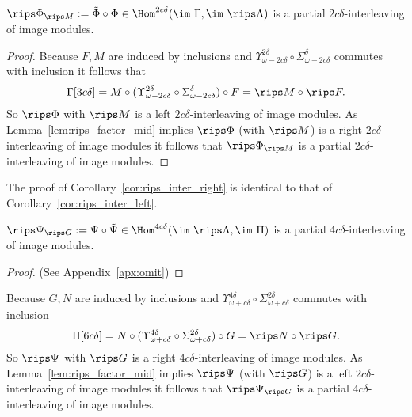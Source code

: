 \begin{corollary}\label{cor:rips_inter_left}
  $\rips \Phi_{\rips M} := \tilde{\Phi}\circ \Phi\in\Hom^{2c\delta}(\im~\Gamma,\im~\rips\Lambda)$ is a partial $2c\delta$-interleaving of image modules.
\end{corollary}
\begin{proof}
  Because $F,M$ are induced by inclusions and $\Upsilon_{\omega-2c\delta}^{2\delta}\circ \Sigma_{\omega-2c\delta}^{\delta}$ commutes with inclusion it follows that
  \[\Gamma[3c\delta] = M\circ (\Upsilon_{\omega-2c\delta}^{2\delta}\circ \Sigma_{\omega-2c\delta}^{\delta})\circ F = \rips M\circ \rips F.\]
  So $\rips\Phi$ with $\rips M$ is a left $2c\delta$-interleaving of image modules.
  As Lemma~\ref{lem:rips_factor_mid} implies $\rips \Phi$ (with $\rips M$) is a right $2c\delta$-interleaving of image modules it follows that $\rips \Phi_{\rips M}$ is a partial $2c\delta$-interleaving of image modules.
\end{proof}

The proof of Corollary~\ref{cor:rips_inter_right} is identical to that of Corollary~\ref{cor:rips_inter_left}.

\begin{corollary}\label{cor:rips_inter_right}
  $\rips \Psi_{\rips G} := \Psi\circ\tilde{\Psi}\in\Hom^{4c\delta}(\im~\rips\Lambda, \im~\Pi)$ is a partial $4c\delta$-interleaving of image modules.
\end{corollary}\begin{proof}
  (See Appendix~\ref{apx:omit})
\end{proof}
\proofatend
  Because $G,N$ are induced by inclusions and $\Upsilon_{\omega+c\delta}^{4\delta}\circ \Sigma_{\omega+c\delta}^{2\delta}$ commutes with inclusion
  \[\Pi[6c\delta] = N\circ (\Upsilon_{\omega+c\delta}^{4\delta}\circ \Sigma_{\omega+c\delta}^{2\delta})\circ G = \rips N\circ \rips G.\]
  So $\rips\Psi$ with $\rips G$ is a right $4c\delta$-interleaving of image modules.
  As Lemma~\ref{lem:rips_factor_mid} implies $\rips \Psi$ (with $\rips G$) is a left $2c\delta$-interleaving of image modules it follows that $\rips \Psi_{\rips G}$ is a partial $4c\delta$-interleaving of image modules.
\endproofatend

